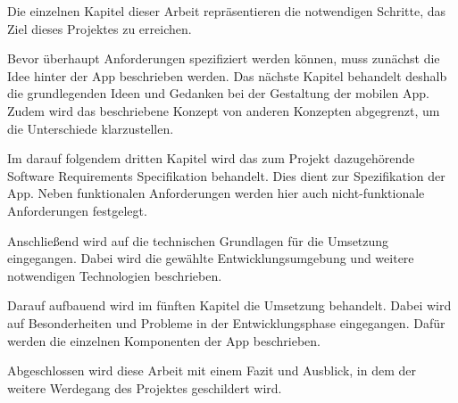 Die einzelnen Kapitel dieser Arbeit repräsentieren die notwendigen Schritte, das Ziel dieses Projektes zu erreichen.

Bevor überhaupt Anforderungen spezifiziert werden können, muss zunächst die Idee hinter der App beschrieben werden. Das nächste Kapitel behandelt deshalb die grundlegenden Ideen und Gedanken bei der Gestaltung der mobilen App. Zudem wird das beschriebene Konzept von anderen Konzepten abgegrenzt, um die Unterschiede klarzustellen.

Im darauf folgendem dritten Kapitel wird das zum Projekt dazugehörende Software Requirements Specifikation behandelt. Dies dient zur Spezifikation der App. Neben funktionalen Anforderungen werden hier auch nicht-funktionale Anforderungen festgelegt.

Anschließend wird auf die technischen Grundlagen für die Umsetzung eingegangen. Dabei wird die gewählte Entwicklungsumgebung und weitere notwendigen Technologien beschrieben.

Darauf aufbauend wird im fünften Kapitel die Umsetzung behandelt. Dabei wird auf Besonderheiten und Probleme in der Entwicklungsphase eingegangen. Dafür werden die einzelnen Komponenten der App beschrieben.

Abgeschlossen wird diese Arbeit mit einem Fazit und Ausblick, in dem der weitere Werdegang des Projektes geschildert wird.